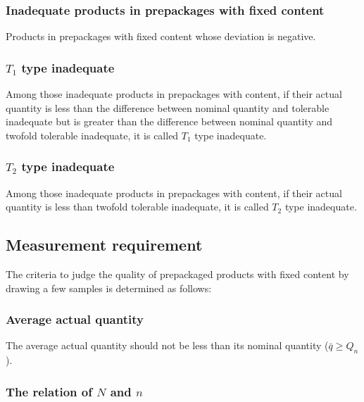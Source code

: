 \documentclass[conf]{new-aiaa}
\begin{document}
\subsubsection*{Inadequate products in prepackages with fixed content }
Products in prepackages with fixed content whose deviation is negative.

\subsubsection*{$T_1$ type inadequate}
Among those inadequate products in prepackages with content, if their actual quantity is less than the difference between nominal quantity and tolerable inadequate but is greater than the difference between nominal quantity and twofold tolerable inadequate, it is called $T_1$ type inadequate.

\subsubsection*{$T_2$ type inadequate}
Among those inadequate products in prepackages with content, if their actual quantity is less than twofold tolerable inadequate, it is called $T_2$ type inadequate.

\subsection{Measurement requirement}

The criteria to judge the quality of prepackaged products with fixed content by drawing a few samples is determined as follows:

\subsubsection{Average actual quantity}

The average actual quantity should not be less than its nominal quantity ($\bar{q}\ge Q_n$).

\subsubsection{The relation of $N$ and $n$}
\end{document}
